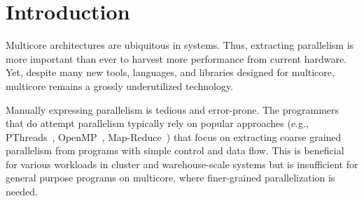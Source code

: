 \section{Introduction}



Multicore architectures are ubiquitous in systems.  Thus, extracting
parallelism is more important than ever to harvest more performance
from current hardware.
%
Yet, despite many new tools, languages, and libraries designed for
multicore, multicore remains a grossly underutilized technology.
%

%
Manually expressing parallelism is tedious and error-prone. The
programmers that do attempt parallelism typically rely on popular
approaches (e.g., PThreads~\cite{pthread:web},
OpenMP~\cite{openmp:web}, Map-Reduce~\cite{dean:08:cacm}) that focus
on extracting coarse grained parallelism from programs with simple
control and data flow. This is beneficial for various workloads in
cluster and warehouse-scale systems but is insufficient for general
purpose programs on multicore, where finer-grained parallelization is
needed.

